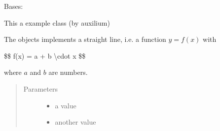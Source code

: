 \documentclass[a4paper,10pt,english]{sphinxmanual}
\begin{document}

\begin{fulllineitems}
\label{\detokenize{api/Derivate:Derivate.Line}}
\sphinxAtStartPar
Bases: 

\sphinxAtStartPar
This a example class (by auxilium)

\sphinxAtStartPar
The {\hyperref[\detokenize{api/Derivate:Derivate.Line}]{}} objects implements a straight line,
i.e. a function \(y = f(x)\) with

\sphinxAtStartPar
\$\$  f(x) = a + b \textbackslash{}cdot x  \$\$

\sphinxAtStartPar
where \(a\) and \(b\) are numbers.

\begin{sphinxVerbatim}[commandchars=\\\{\}]
   
    
   
  
\end{sphinxVerbatim}
\begin{quote}\begin{description}
\item[{Parameters}] \leavevmode\begin{itemize}
\item {} 
\sphinxAtStartPar
{} \textendash{} a value

\item {} 
\sphinxAtStartPar
{} \textendash{} another value


\end{itemize}
\end{description}
\end{quote}
\end{fulllineitems}
\end{document}

